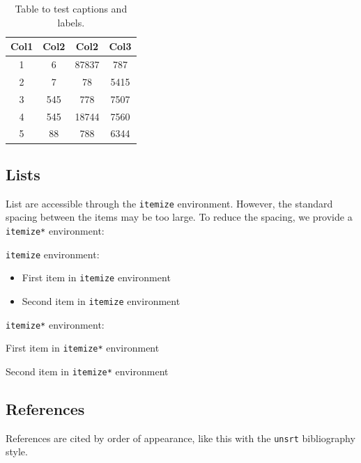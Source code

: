 \documentclass[license]{qirtconference}
\begin{document}
\begin{table}[h!]
\centering
\caption{\label{table:table1} Table to test captions and labels.}
\begin{tabular}{|c|c|c|c|}
 \hline
 Col1 & Col2 & Col2 & Col3 \\ [0.5ex] 
 \hline
 1 & 6 & 87837 & 787 \\ 
 \hline
 2 & 7 & 78 & 5415 \\
 \hline
 3 & 545 & 778 & 7507 \\
 \hline
 4 & 545 & 18744 & 7560 \\
 \hline
 5 & 88 & 788 & 6344 \\ [1ex] 
 \hline
\end{tabular}

\label{table:1}
\end{table}

\subsection{Lists}
List are accessible through the \verb~itemize~ environment. However, the standard spacing between the items may be too large. To reduce the spacing, we provide a \verb~itemize*~ environment:

\verb~itemize~ environment:

\begin{itemize}
\item First item in \verb~itemize~ environment
\item Second item in \verb~itemize~ environment
\end{itemize}

\verb~itemize*~ environment:

\begin{itemize*}
\item First item in \verb~itemize*~ environment
\item Second item in \verb~itemize*~ environment
\end{itemize*}

\subsection{References}
References are cited by order of appearance, like this \cite{MARTIN19771, doi:10.3166/qirt.4.107-123, inproceedings, RENKIELSKA2006867} with the \verb~unsrt~ bibliography style.


\end{document}
